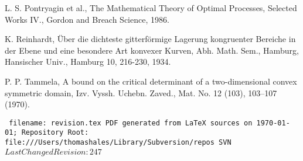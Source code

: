 \documentclass[11pt]{amsart}
\def\svninfo{{\tt
  filename: revision.tex\hfill\break
  PDF generated from LaTeX sources on \today; \hfill\break
  Repository Root: file:///Users/thomashales/Library/Subversion/repos
  SVN $LastChangedRevision: 247 $
  }
  }
\begin{document}
\begin{thebibliography}{}
 L. S. Pontryagin et al., The Mathematical Theory of Optimal Processes, Selected Works IV., Gordon and Breach Science, 1986.

 K. Reinhardt, \"Uber die dichteste gitterf\"ormige Lagerung
kongruenter Bereiche in der Ebene und eine besondere Art konvexer Kurven, Abh. Math. Sem., Hamburg, Hansischer Univ., Hamburg 10, 216-230, 1934.

 P. P. Tammela, A bound on the critical determinant of a two-dimensional convex symmetric domain,  Izv. Vyssh. Uchebn. Zaved., Mat. No. 12 (103), 103--107 (1970).




\end{thebibliography}

\svninfo
\end{document}

